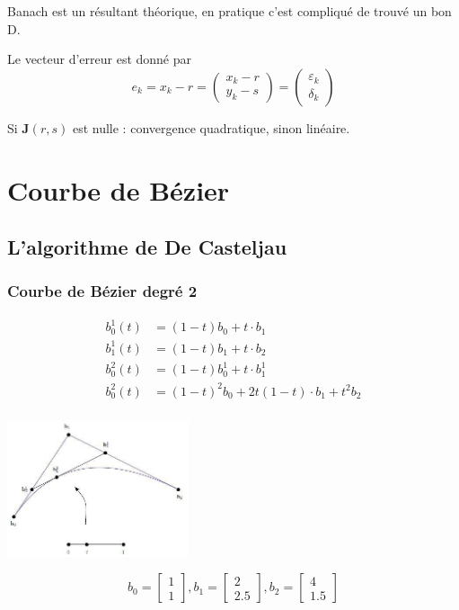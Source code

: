 \documentclass[a4paper,9pt]{extarticle}
\begin{document}
\begin{multicols*}{2}
Banach est un résultant théorique, en pratique c'est compliqué de trouvé un bon D.

Le vecteur d'erreur est donné par
$$
e_k = x_k - r = (\begin{array}{c}
x_k-r \\ 
y_k-s
\end{array} ) = (\begin{matrix}
\varepsilon_k \\ 
\delta_k
\end{matrix})
$$

Si $\textbf{J}(r,s)$ est nulle : convergence quadratique, sinon linéaire.

\section{Courbe de Bézier}
\subsection{L'algorithme de De Casteljau}
\subsubsection{Courbe de Bézier degré 2}
\begin{align*}
b_0^1(t) &= (1-t)b_0 + t\cdot b_1\\
b_1^1(t) &= (1-t)b_1 + t\cdot b_2\\
b_0^2(t) &= (1-t)b_0^1 + t\cdot b_1^1\\
b_0^2(t) &= (1-t)^2b_0 + 2t(1-t)\cdot b_1 + t^2b_2\\
\end{align*}
\begin{center}
\includegraphics[width=0.4\textwidth]{img/bezier_1.jpg}\\ 
\end{center}
$$
b_0 = 
\begin{bmatrix}1\\1\end{bmatrix},
b_1 = 
\begin{bmatrix}2\\2.5\end{bmatrix},
b_2 = 
\begin{bmatrix}4\\1.5\end{bmatrix}
$$


\end{multicols*}
\end{document}
